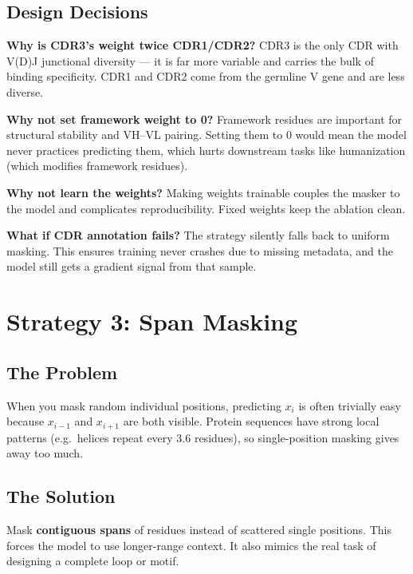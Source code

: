 \documentclass[11pt]{article}
\begin{document}
\subsection{Design Decisions}

\textbf{Why is CDR3's weight twice CDR1/CDR2?}
CDR3 is the only CDR with V(D)J junctional diversity --- it is
far more variable and carries the bulk of binding specificity.
CDR1 and CDR2 come from the germline V gene and are less diverse.

\textbf{Why not set framework weight to 0?}
Framework residues are important for structural stability and
VH--VL pairing. Setting them to 0 would mean the model never
practices predicting them, which hurts downstream tasks like
humanization (which modifies framework residues).

\textbf{Why not learn the weights?}
Making weights trainable couples the masker to the model and
complicates reproducibility. Fixed weights keep the ablation clean.

\textbf{What if CDR annotation fails?}
The strategy silently falls back to uniform masking. This ensures
training never crashes due to missing metadata, and the model
still gets a gradient signal from that sample.

\section{Strategy 3: Span Masking}
\label{sec:span}

\subsection{The Problem}
When you mask random individual positions, predicting $x_i$ is
often trivially easy because $x_{i-1}$ and $x_{i+1}$ are both
visible. Protein sequences have strong local patterns (e.g.\
helices repeat every 3.6 residues), so single-position masking
gives away too much.

\subsection{The Solution}
Mask \textbf{contiguous spans} of residues instead of scattered
single positions. This forces the model to use longer-range
context. It also mimics the real task of designing a complete
loop or motif.
\end{document}
